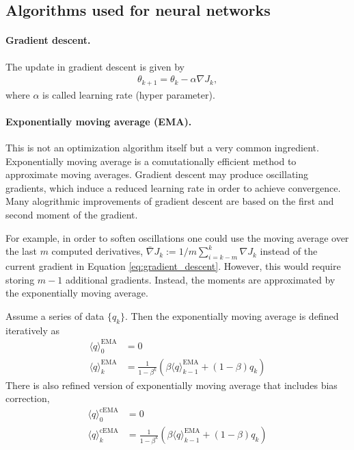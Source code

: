 \documentclass[12pt,a4paper]{article}
\begin{document}
\subsection{Algorithms used for neural networks}
\paragraph{Gradient descent.}
The update in gradient descent is given by
\begin{align} \label{eq:gradient_descent}
	\theta_{k+1} = \theta_k - \alpha \nabla J_k,
\end{align}
where $\alpha$ is called learning rate (hyper parameter).

\paragraph{Exponentially moving average (EMA).} This is not an optimization algorithm itself but a very common ingredient. Exponentially moving average is a comutationally efficient method to approximate moving averages.
Gradient descent may produce oscillating gradients, which induce a reduced learning rate in order to achieve convergence. Many alogrithmic improvements of gradient descent are based on the first and second moment of the gradient. 

For example, in order to soften  oscillations one could use the moving average over the last $m$ computed derivatives, $\bar \nabla J_k := 1/m \sum_{i=k-m} ^ k \nabla J_k$ instead of the current gradient in Equation \ref{eq:gradient_descent}. However, this would require storing $m-1$ additional gradients. Instead,  the moments are approximated by the exponentially moving average.

Assume a series of data $\{q_k\}$. Then the exponentially moving average is defined iteratively as
\begin{align}
\langle  q \rangle ^{\text{EMA}}_0 &= 0\\ 
\langle  q \rangle ^{\text{EMA}}_k &= \frac{1}{1-\beta^k}\left(\beta \langle  q \rangle ^{\text{EMA}}_{k-1}+ (1-\beta) q_k\right) \label{eq:ema}
\end{align}
There is also refined version of exponentially moving average  that includes bias correction,
\begin{align}
\langle  q \rangle ^{\text{cEMA}}_0 &= 0\\ 
\langle  q \rangle ^{\text{cEMA}}_k &= \frac{1}{1-\beta^k}\left(\beta \langle  q \rangle ^{\text{EMA}}_{k-1}+ (1-\beta) q_k\right)
\end{align}
\end{document}
